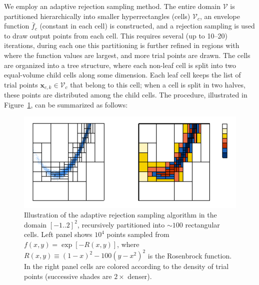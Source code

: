 \documentclass[12pt]{article}
\newcommand{\bx}{\boldsymbol{x}}
\begin{document}
We employ an adaptive rejection sampling method.
The entire domain $\mathcal{V}$ is partitioned hierarchically into smaller hyperrectangles (cells) $\mathcal{V}_c$, an envelope function $\bar f_c$ (constant in each cell) is constructed, and a rejection sampling is used to draw output points from each cell. This requires several (up to 10--20) iterations, during each one this partitioning is further refined in regions with where the function values are largest, and more trial points are drawn. The cells are organized into a tree structure, where each non-leaf cell is split into two equal-volume child cells along some dimension. Each leaf cell keeps the list of trial points $\bx_{c,k}\in\mathcal{V}_c$ that belong to this cell; when a cell is split in two halves, these points are distributed among the child cells.
The procedure, illustrated in Figure~\ref{fig:Sampling}, can be summarized as follows:

\begin{figure}
\begin{center}
\includegraphics[width=15cm]{Sampling.pdf}
\end{center}
\caption{Illustration of the adaptive rejection sampling algorithm in the domain $[-1..2]^2$, recursively partitioned into $\sim 100$ rectangular cells. Left panel shows $10^4$ points sampled from $f(x,y) = \exp[-R(x,y)]$, where $R(x,y) \equiv (1-x)^2-100(y-x^2)^2$ is the Rosenbrock function. In the right panel cells are colored according to the density of trial points (successive shades are $2\times$ denser).
} \label{fig:Sampling}
\end{figure}
\end{document}
